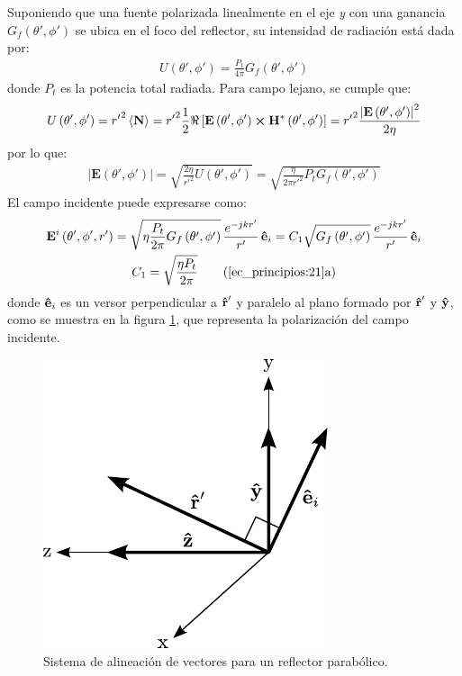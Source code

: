 Suponiendo que una fuente polarizada linealmente en el eje \emph{y} con una ganancia $G_f\left(\theta ',\phi '\right)$ se ubica en el foco del reflector, su intensidad de radiación está dada por:
\begin{align}
U\left(\theta ',\phi '\right) = \frac{P_t}{4\pi}G_f\left(\theta ',\phi '\right)
\label{ec_principios:18}
\end{align}
donde $P_t$ es la potencia total radiada. Para campo lejano, se cumple que:
\begin{align}
U\left(\theta ',\phi '\right) = {r'}^2\left<\mathbf{N}\right> = {r'}^2\frac{1}{2}\Re\left[\mathbf{E}\left(\theta ',\phi '\right)\boldsymbol{\times}\mathbf{H}^*\left(\theta ',\phi '\right)\right] = {r'}^2\frac{\left|\mathbf{E}\left(\theta ',\phi '\right)\right|^2}{2\eta}
\label{ec_principios:19}
\end{align}
por lo que:
\begin{align}
\left|\mathbf{E}\left(\theta ',\phi '\right)\right| = \sqrt{\frac{2\eta}{{r'}^2}U\left(\theta ',\phi '\right)} = \sqrt{\frac{\eta}{2\pi{r'}^2}P_tG_f\left(\theta ',\phi '\right)}
\label{ec_principios:20}
\end{align}
El campo incidente puede expresarse como:
\begin{gather}
\mathbf{E}^i\left(\theta ',\phi ', r'\right) = \sqrt{\eta\frac{P_t}{2\pi}G_f\left(\theta ',\phi '\right)}\,\frac{e^{-jkr'}}{r'}\,\versor{e}_i = C_1\sqrt{G_f\left(\theta ',\phi '\right)}\,\frac{e^{-jkr'}}{r'}\,\versor{e}_i
\label{ec_principios:21}\\
C_1 = \sqrt{\frac{\eta P_t}{2\pi}}
\tag{\ref{ec_principios:21}a}
\label{ec_principios:22}
\end{gather}
donde $\bm{\mathbf{\hat{e}}}_i$ es un versor perpendicular a $\bm{\mathbf{\hat{r}}}'$ y paralelo al plano formado por $\bm{\mathbf{\hat{r}}}'$ y $\bm{\mathbf{\hat{y}}}$, como se muestra en la figura \ref{fig_principios:4}, que representa la polarización del campo incidente.
\begin{figure}[H]
\centering
\includegraphics[scale = 1]{Figures/Principios/principios_4}
\caption{Sistema de alineación de vectores para un reflector parabólico.}
\label{fig_principios:4}
\end{figure}
